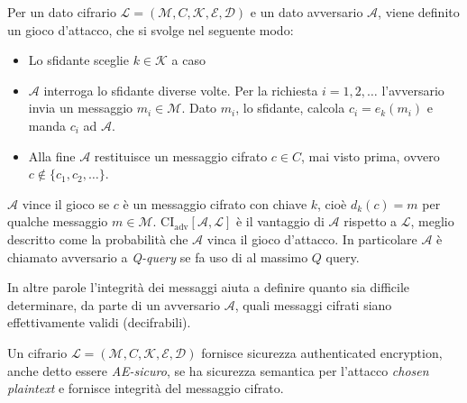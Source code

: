\begin{definition}
    \label{def:ciphertext_integrity}
    Per un dato cifrario $\mathcal{L} = (\mathcal{M},C,\mathcal{K},\mathcal{E},\mathcal{D})$ e un dato avversario $\mathcal{A}$, viene definito un gioco d'attacco, che si svolge nel seguente modo:
    
    \begin{itemize}
        \item Lo sfidante sceglie $k \in \mathcal{K}$ a caso
        \item $\mathcal{A}$ interroga lo sfidante diverse volte. Per la richiesta $i=1,2,\dots$ l'avversario invia un messaggio $m_i \in \mathcal{M}$. Dato $m_i$, lo sfidante, calcola $c_i = e_k(m_i)$ e manda $c_i$ ad $\mathcal{A}$.
        \item  Alla fine $\mathcal{A}$ restituisce un messaggio cifrato $c \in C$, mai visto prima, ovvero $c \not\in \{c_1,c_2,\dots\}$. 
    \end{itemize}

    $\mathcal{A}$ vince il gioco se $c$ è un messaggio cifrato con chiave $k$, cioè $d_k(c) = m$ per qualche messaggio $m \in \mathcal{M}$. $\text{CI}_\text{adv}[\mathcal{A},\mathcal{L}]$ è il vantaggio di $\mathcal{A}$ rispetto a $\mathcal{L}$, meglio descritto come la probabilità che $\mathcal{A}$ vinca il gioco d'attacco. In particolare $\mathcal{A}$ è chiamato avversario a \textit{Q-query} se fa uso di al massimo $Q$ query.

    \vspace{1em}
    In altre parole l'integrità dei messaggi aiuta a definire quanto sia difficile determinare, da parte di un avversario $\mathcal{A}$, quali messaggi cifrati siano effettivamente validi (decifrabili).
\end{definition}


\begin{definition}[Sicurezza AE]
    Un cifrario $\mathcal{L} = (\mathcal{M},C,\mathcal{K},\mathcal{E},\mathcal{D})$ fornisce sicurezza authenticated encryption, anche detto essere \textit{AE-sicuro}, se ha sicurezza semantica per l'attacco \emph{chosen plaintext} e fornisce integrità del messaggio cifrato. 
\end{definition}

